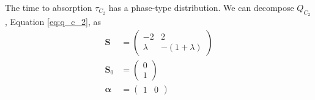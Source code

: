 \documentclass{article}
\theoremstyle{plain}
\theoremstyle{definition}
\theoremstyle{remark}
\numberwithin{equation}{section}
\begin{document}
The time to absorption $\tau_{C_2}$ has a phase-type distribution.
We can decompose $Q_{C_2}$, Equation \eqref{eq:q_c_2}, as
\begin{align*}
    \mathbf{S} &= \begin{pmatrix}
        -2 & 2\\
        \lambda & - (1 + \lambda)
    \end{pmatrix}\\
    \mathbf{S}_0 &= \begin{pmatrix}
        0\\
        1
    \end{pmatrix}\\
    \boldsymbol{\alpha} &= \begin{pmatrix}
    1 & 0
    \end{pmatrix}
\end{align*}
\end{document}
